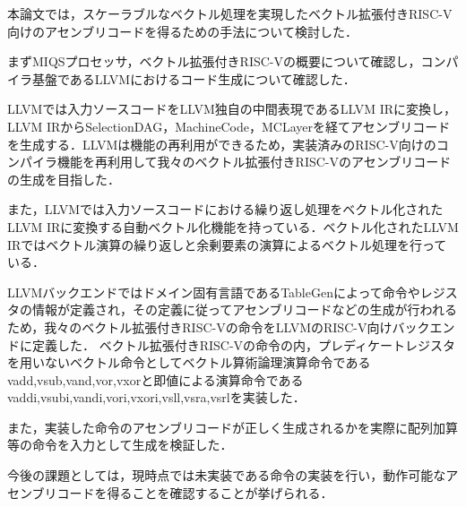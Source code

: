 
本論文では，スケーラブルなベクトル処理を実現したベクトル拡張付きRISC-V向けのアセンブリコードを得るための手法について検討した．

まずMIQSプロセッサ，ベクトル拡張付きRISC-Vの概要について確認し，コンパイラ基盤であるLLVMにおけるコード生成について確認した．

LLVMでは入力ソースコードをLLVM独自の中間表現であるLLVM IRに変換し，LLVM IRからSelectionDAG，MachineCode，MCLayerを経てアセンブリコードを生成する．LLVMは機能の再利用ができるため，実装済みのRISC-V向けのコンパイラ機能を再利用して我々のベクトル拡張付きRISC-Vのアセンブリコードの生成を目指した．

また，LLVMでは入力ソースコードにおける繰り返し処理をベクトル化されたLLVM IRに変換する自動ベクトル化機能を持っている．ベクトル化されたLLVM IRではベクトル演算の繰り返しと余剰要素の演算によるベクトル処理を行っている．

LLVMバックエンドではドメイン固有言語であるTableGenによって命令やレジスタの情報が定義され，その定義に従ってアセンブリコードなどの生成が行われるため，我々のベクトル拡張付きRISC-Vの命令をLLVMのRISC-V向けバックエンドに定義した．
ベクトル拡張付きRISC-Vの命令の内，プレディケートレジスタを用いないベクトル命令としてベクトル算術論理演算命令であるvadd,vsub,vand,vor,vxorと即値による演算命令であるvaddi,vsubi,vandi,vori,vxori,vsll,vsra,vsrlを実装した．


また，実装した命令のアセンブリコードが正しく生成されるかを実際に配列加算等の命令を入力として生成を検証した．

今後の課題としては，現時点では未実装である命令の実装を行い，動作可能なアセンブリコードを得ることを確認することが挙げられる．
